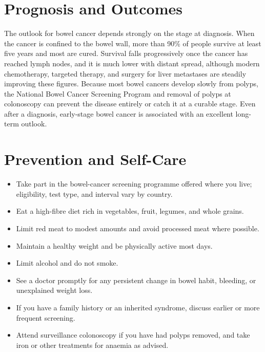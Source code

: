 \section*{Prognosis and Outcomes}
The outlook for bowel cancer depends strongly on the stage at diagnosis. When the cancer is confined to the bowel wall, more than 90\% of people survive at least five years and most are cured. Survival falls progressively once the cancer has reached lymph nodes, and it is much lower with distant spread, although modern chemotherapy, targeted therapy, and surgery for liver metastases are steadily improving these figures. Because most bowel cancers develop slowly from polyps, the National Bowel Cancer Screening Program and removal of polyps at colonoscopy can prevent the disease entirely or catch it at a curable stage. Even after a diagnosis, early-stage bowel cancer is associated with an excellent long-term outlook.

\section*{Prevention and Self-Care}
\begin{itemize}
    \item Take part in the bowel-cancer screening programme offered where you live; eligibility, test type, and interval vary by country.
    \item Eat a high-fibre diet rich in vegetables, fruit, legumes, and whole grains.
    \item Limit red meat to modest amounts and avoid processed meat where possible.
    \item Maintain a healthy weight and be physically active most days.
    \item Limit alcohol and do not smoke.
    \item See a doctor promptly for any persistent change in bowel habit, bleeding, or unexplained weight loss.
    \item If you have a family history or an inherited syndrome, discuss earlier or more frequent screening.
    \item Attend surveillance colonoscopy if you have had polyps removed, and take iron or other treatments for anaemia as advised.
\end{itemize}


